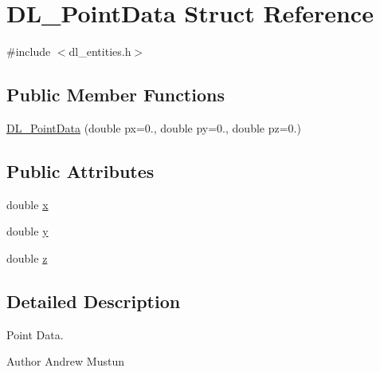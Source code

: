\hypertarget{structDL__PointData}{\section{D\-L\-\_\-\-Point\-Data Struct Reference}
\label{structDL__PointData}
}


{\ttfamily \#include $<$dl\-\_\-entities.\-h$>$}

\subsection*{Public Member Functions}
\begin{DoxyCompactItemize}
\item 
\hyperlink{structDL__PointData_ac63d6fdb6d50f02b89df892f2768cb52}{D\-L\-\_\-\-Point\-Data} (double px=0., double py=0., double pz=0.)
\end{DoxyCompactItemize}
\subsection*{Public Attributes}
\begin{DoxyCompactItemize}
\item 
double \hyperlink{structDL__PointData_a7a771a453a16a42b58b36acde88c8950}{x}
\item 
double \hyperlink{structDL__PointData_a59ad290d11a224bd74f7cc7b8af17a7e}{y}
\item 
double \hyperlink{structDL__PointData_a235f953f94945eae174f5cae94ea7b50}{z}
\end{DoxyCompactItemize}


\subsection{Detailed Description}
Point Data.

\begin{DoxyAuthor}{Author}
Andrew Mustun 
\end{DoxyAuthor}


